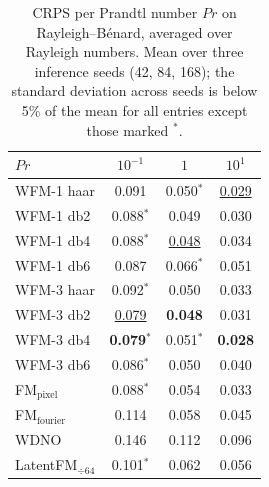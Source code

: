 \begin{table}[ht]
\centering
\caption{CRPS per Prandtl number $Pr$ on Rayleigh--B\'enard, averaged over Rayleigh numbers. Mean over three inference seeds (42, 84, 168); the standard deviation across seeds is below 5\% of the mean for all entries except those marked $^{*}$.}
\label{tab:ablation_rb_crps_pr}
\begin{tabular}{lccc}
\toprule
$Pr$ & $10^{-1}$ & $1$ & $10^{1}$ \\
\midrule
WFM-1 haar & 0.091 & 0.050$^{*}$ & \underline{0.029} \\
WFM-1 db2 & 0.088$^{*}$ & 0.049 & 0.030 \\
WFM-1 db4 & 0.088$^{*}$ & \underline{0.048} & 0.034 \\
WFM-1 db6 & 0.087 & 0.066$^{*}$ & 0.051 \\
\midrule
WFM-3 haar & 0.092$^{*}$ & 0.050 & 0.033 \\
WFM-3 db2 & \underline{0.079} & \textbf{0.048} & 0.031 \\
WFM-3 db4 & \textbf{0.079}$^{*}$ & 0.051$^{*}$ & \textbf{0.028} \\
WFM-3 db6 & 0.086$^{*}$ & 0.050 & 0.040 \\
\midrule
FM$_\text{pixel}$ & 0.088$^{*}$ & 0.054 & 0.033 \\
FM$_\text{fourier}$ & 0.114 & 0.058 & 0.045 \\
WDNO & 0.146 & 0.112 & 0.096 \\
LatentFM$_{\div 64}$ & 0.101$^{*}$ & 0.062 & 0.056 \\
\bottomrule
\end{tabular}
\end{table}
